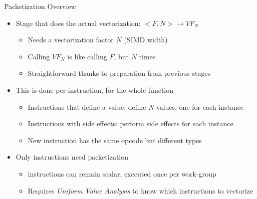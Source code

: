 
\begin{frame}{Packetization Overview}

\begin{itemize}
    \item Stage that does the actual vectorization: $<F, N> \rightarrow VF_N$
    \begin{itemize}
        \item Needs a vectorization factor $N$ (SIMD width)
        \item Calling $VF_N$ is like calling $F$, but $N$ times
        \item Straightforward thanks to preparation from previous stages
    \end{itemize}
    
    \item This is done per-instruction, for the whole function
    \begin{itemize}
        \item Instructions that define a value: define $N$ values, one for each instance
        \item Instructions with side effects: perform side effects for each instance
        \item New instruction has the same opcode but different types
    \end{itemize}
    
    \item Only  instructions need packetization
    \begin{itemize}
        \item {} instructions can remain scalar, executed once per work-group
        \item Requires \emph{Uniform Value Analysis} to know which instructions to vectorize
    \end{itemize}
    
\end{itemize}

\end{frame}


